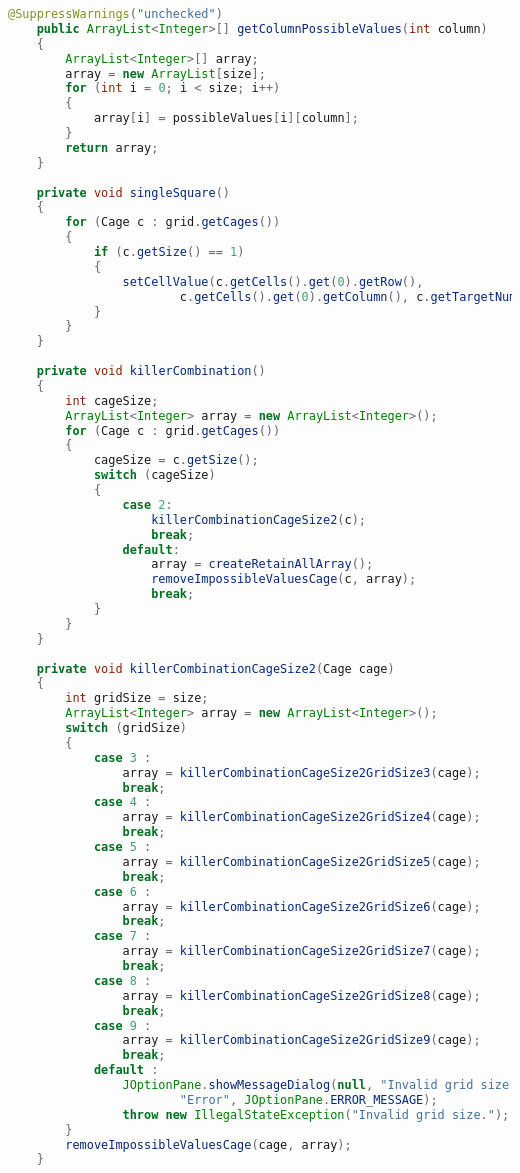 \begin{lstlisting}[language=Java,basicstyle=\tiny,caption=SolverRuleBased.java]
    @SuppressWarnings("unchecked")
	public ArrayList<Integer>[] getColumnPossibleValues(int column)
    {
        ArrayList<Integer>[] array;
        array = new ArrayList[size];
        for (int i = 0; i < size; i++)
        {
            array[i] = possibleValues[i][column];
        }
        return array;
    }
    
    private void singleSquare()
    {
        for (Cage c : grid.getCages())
        {
            if (c.getSize() == 1)
            {
                setCellValue(c.getCells().get(0).getRow(), 
                        c.getCells().get(0).getColumn(), c.getTargetNumber());
            }
        }
    }
    
    private void killerCombination()
    {
        int cageSize;
        ArrayList<Integer> array = new ArrayList<Integer>();
        for (Cage c : grid.getCages())
        {
            cageSize = c.getSize();
            switch (cageSize)
            {
                case 2:
                    killerCombinationCageSize2(c);
                    break;
                default:
                    array = createRetainAllArray();
                    removeImpossibleValuesCage(c, array);
                    break;
            }
        }
    }
    
    private void killerCombinationCageSize2(Cage cage)
    {
        int gridSize = size;
        ArrayList<Integer> array = new ArrayList<Integer>();
        switch (gridSize)
        {
            case 3 :
                array = killerCombinationCageSize2GridSize3(cage);
                break;
            case 4 :
                array = killerCombinationCageSize2GridSize4(cage);
                break;
            case 5 :
                array = killerCombinationCageSize2GridSize5(cage);
                break;
            case 6 :
                array = killerCombinationCageSize2GridSize6(cage);
                break;
            case 7 :
                array = killerCombinationCageSize2GridSize7(cage);
                break;
            case 8 :
                array = killerCombinationCageSize2GridSize8(cage);
                break;
            case 9 :
                array = killerCombinationCageSize2GridSize9(cage);
                break;
            default :
                JOptionPane.showMessageDialog(null, "Invalid grid size.", 
                        "Error", JOptionPane.ERROR_MESSAGE);
                throw new IllegalStateException("Invalid grid size.");
        }
        removeImpossibleValuesCage(cage, array);
    }


\end{lstlisting}

